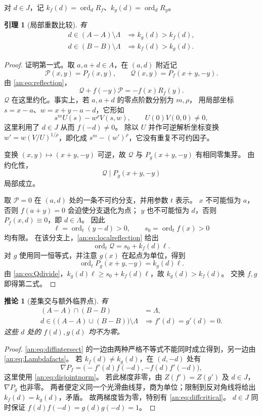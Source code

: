 \documentclass[11pt,a4paper,oneside,openany]{book}
\theoremstyle{lecture}
\newtheorem{lemma}[theorem]{引理}
\newtheorem{corollary}[theorem]{推论}
\newcommand{\ord}{\operatorname{ord}}
\numberwithin{equation}{section}
\begin{document}
对 $d\in J$，记 $k_f(d)=\ord_dR_f$、$k_g(d)=\ord_dR_g$。
\begin{lemma}[局部重数比较]\label{an:lem:local-compare}
有
\begin{align}
 d\in(A-A)\setminus\Lambda&\Longrightarrow k_g(d)>k_f(d),\label{an:eq:strictA}\\
 d\in(B-B)\setminus\Lambda&\Longrightarrow k_f(d)>k_g(d).\label{an:eq:strictB}
\end{align}
\end{lemma}
\begin{proof}
证明第一式。取 $a,a+d\in A$，在 $(a,d)$ 附近记
\[
 \mathcal P(x,y)=P_f(x,y),\qquad
 \mathcal Q(x,y)=P_f(x+y,-y).
\]
由 \eqref{an:eq:reflection}，
\begin{equation}\label{an:eq:localreflection}
 \mathcal Q+f(-y)\mathcal P=-f(x)R_f(y).
\end{equation}
$\mathcal Q$ 在这里约化。事实上，若 $a,a+d$ 的零点阶数分别为 $m,\rho$，
用局部坐标 $s=x-a$、$w=x+y-a-d$，它形如
\[
 s^mU(s)-w^{\rho}V(s,w),\qquad U(0)V(0,0)\ne0,
\]
这里利用了 $d\in J$ 从而 $f(-d)\ne0$。
除以 $U$ 并作可逆解析坐标变换
$w'=w(V/U)^{1/\rho}$，即化成 $s^m-(w')^\rho$，它没有重复不可约因子。

变换 $(x,y)\mapsto(x+y,-y)$ 可逆，故 $\mathcal Q$ 与 $P_g(x+y,-y)$ 有相同零集芽。
由约化性，
\begin{equation}\label{an:eq:Qdivide}
 \mathcal Q\mid P_g(x+y,-y)
\end{equation}
局部成立。

取 $\mathcal P=0$ 在 $(a,d)$ 处的一条不可约分支，并用参数 $t$ 表示。
$x$ 不可能恒为 $a$，否则 $f(a+y)=0$ 会迫使分支退化为点；
$y$ 也不可能恒为 $d$，否则 $P_f(x,d)\equiv0$，即 $d\in\Lambda$。
因此
\[
 \ell=\ord_t(y-d)>0,\qquad s_0=\ord_tf(x)>0
\]
均有限。
在该分支上，\eqref{an:eq:localreflection} 给出
\[
 \ord_t\mathcal Q=s_0+k_f(d)\ell.
\]
对 $g$ 使用同一恒等式，并注意 $g(x)$ 在起点为单位，得到
\[
 \ord_tP_g(x+y,-y)=k_g(d)\ell.
\]
由 \eqref{an:eq:Qdivide}，$k_g(d)\ell\ge s_0+k_f(d)\ell$，故 $k_g(d)>k_f(d)$。
交换 $f,g$ 即得第二式。
\end{proof}

\begin{corollary}[差集交与额外临界点]\label{an:cor:diffcritical}
有
\begin{align}
 (A-A)\cap(B-B)&=\Lambda,\label{an:eq:diffintersect}\\
 d\in\bigl((A-A)\cup(B-B)\bigr)\setminus\Lambda
 &\Longrightarrow f'(d)=g'(d)=0.\label{an:eq:diffcritical}
\end{align}
这些 $d$ 处的 $f(d),g(d)$ 均不为零。
\end{corollary}
\begin{proof}
\eqref{an:eq:diffintersect} 的一边由两种严格不等式不能同时成立得到，另一边由 \eqref{an:eq:Lambdafacts}。
若 $k_f(d)\ne k_g(d)$，在 $(d,-d)$ 处有
\[
 \nabla P_f=\bigl(-f'(d)f(-d),-f(d)f'(-d)\bigr),
\]
这里使用 \eqref{an:eq:disjointnorm}。
若此梯度非零，由 $Z(f')=Z(g')$ 及 $d\in J$，$\nabla P_g$ 也非零。
两者便定义同一个光滑曲线芽，商为单位；限制到反对角线将给出 $k_f(d)=k_g(d)$，矛盾。
故两梯度皆为零，特别有 \eqref{an:eq:diffcritical}。
$d\in J$ 同时保证 $f(d)f(-d)=g(d)g(-d)=1$。
\end{proof}
\end{document}
